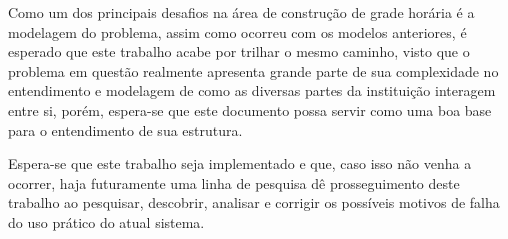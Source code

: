 Como um dos principais desafios na área de construção de grade horária é a modelagem do problema, assim como ocorreu com os modelos anteriores, é esperado que este trabalho acabe por trilhar o mesmo caminho, visto que o problema em questão realmente apresenta grande parte de sua complexidade no entendimento e modelagem de como as diversas partes da instituição interagem entre si, porém, espera-se que este documento possa servir como uma boa base para o entendimento de sua estrutura.

Espera-se que este trabalho seja implementado e que, caso isso não venha a ocorrer, haja futuramente uma linha de pesquisa dê
prosseguimento deste trabalho ao pesquisar, descobrir, analisar e corrigir os possíveis motivos de falha do uso prático do atual sistema.




